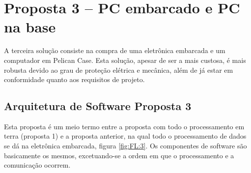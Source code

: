 


\section{Proposta 3 – PC embarcado e PC na base}

A terceira solução consiste na compra de uma eletrônica embarcada e um
computador em Pelican Case. Esta solução, apesar de ser a mais custosa, é mais
robusta devido ao grau de proteção elétrica e mecânica, além de já estar em
conformidade quanto aos requisitos de projeto.

\subsection{Arquitetura de Software Proposta 3}
Esta proposta é um meio termo entre a proposta com todo o processamento em terra
(proposta 1) e a proposta anterior, na qual todo o processamento de dados se dá
na eletrônica embarcada, figura \ref{fig:FL:3}. Os componentes de software são
basicamente os mesmos, excetuando-se a ordem em que o processamento e a comunicação ocorrem.




